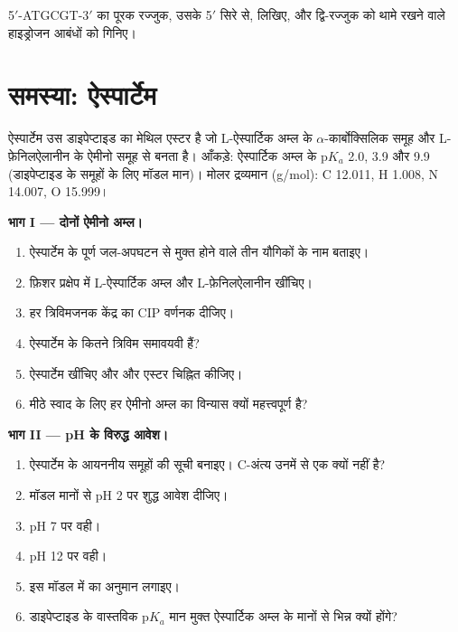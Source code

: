 \begin{exercise}[$\star\star\star$]\label{exo:b2:biomolecules:12}
5$'$-ATGCGT-3$'$ का पूरक रज्जुक, उसके 5$'$ सिरे से, लिखिए, और द्वि-रज्जुक को थामे रखने वाले हाइड्रोजन
आबंधों को गिनिए।
\end{exercise}

\section{समस्या: ऐस्पार्टेम}

\begin{problem}
\label{pb:b2:biomolecules:1}
ऐस्पार्टेम उस डाइपेप्टाइड का मेथिल एस्टर है जो L-ऐस्पार्टिक अम्ल के $\alpha$-कार्बोक्सिलिक समूह और
L-फ़ेनिलऐलानीन के ऐमीनो समूह से बनता है। आँकड़े: ऐस्पार्टिक अम्ल के $\mathrm pK_a$ 2.0, 3.9 और 9.9 (डाइपेप्टाइड के
समूहों के लिए मॉडल मान)। मोलर द्रव्यमान (\unit{g/mol}): C 12.011, H 1.008, N 14.007,
O 15.999।

\medskip
\noindent\textbf{भाग I --- दोनों ऐमीनो अम्ल।}
\begin{enumerate}
  \item ऐस्पार्टेम के पूर्ण जल-अपघटन से मुक्त होने वाले तीन यौगिकों के नाम बताइए।
  \item फ़िशर प्रक्षेप में L-ऐस्पार्टिक अम्ल और L-फ़ेनिलऐलानीन खींचिए।
  \item हर त्रिविमजनक केंद्र का CIP वर्णनक दीजिए।
  \item ऐस्पार्टेम के कितने त्रिविम समावयवी हैं?
  \item ऐस्पार्टेम खींचिए और  और एस्टर चिह्नित कीजिए।
  \item मीठे स्वाद के लिए हर ऐमीनो अम्ल का विन्यास क्यों महत्त्वपूर्ण है?
\end{enumerate}

\medskip
\noindent\textbf{भाग II --- pH के विरुद्ध आवेश।}
\begin{enumerate}[resume]
  \item ऐस्पार्टेम के आयननीय समूहों की सूची बनाइए। C-अंत्य उनमें से एक क्यों नहीं है?
  \item मॉडल मानों से pH 2 पर शुद्ध आवेश दीजिए।
  \item pH 7 पर वही।
  \item pH 12 पर वही।
  \item इस मॉडल में  का अनुमान लगाइए।
  \item डाइपेप्टाइड के वास्तविक $\mathrm pK_a$ मान मुक्त ऐस्पार्टिक
        अम्ल के मानों से भिन्न क्यों होंगे?
\end{enumerate}


\end{problem}
